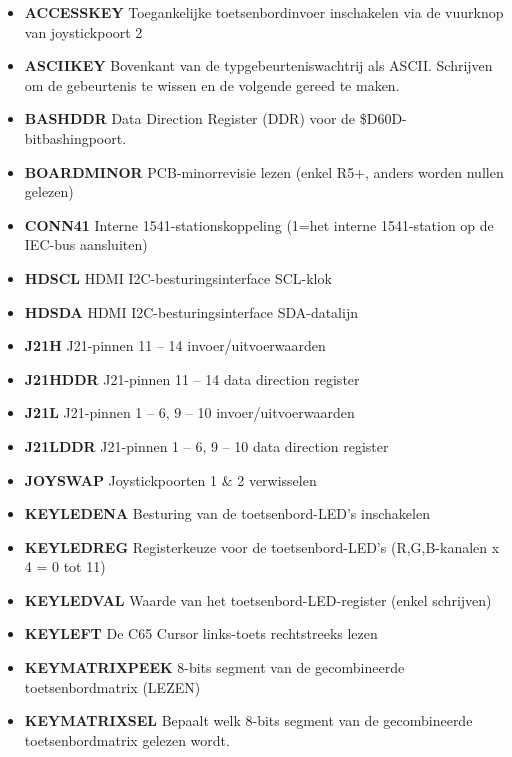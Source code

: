 \begin{itemize}
\item{\bf{ACCESSKEY}} Toegankelijke toetsenbordinvoer inschakelen via de vuurknop van joystickpoort 2
\item{\bf{ASCIIKEY}} Bovenkant van de typgebeurteniswachtrij als ASCII. Schrijven om de gebeurtenis te wissen en de volgende gereed te maken.
\item{\bf{BASHDDR}} Data Direction Register (DDR) voor de \$D60D-bitbashingpoort.
\item{\bf{BOARDMINOR}} PCB-minorrevisie lezen (enkel R5+, anders worden nullen gelezen)
\item{\bf{CONN41}} Interne 1541-stationskoppeling (1=het interne 1541-station op de IEC-bus aansluiten)
\item{\bf{HDSCL}} HDMI I2C-besturingsinterface SCL-klok
\item{\bf{HDSDA}} HDMI I2C-besturingsinterface SDA-datalijn
\item{\bf{J21H}} J21-pinnen 11 -- 14 invoer/uitvoerwaarden
\item{\bf{J21HDDR}} J21-pinnen 11 -- 14 data direction register
\item{\bf{J21L}} J21-pinnen 1 -- 6, 9 -- 10 invoer/uitvoerwaarden
\item{\bf{J21LDDR}} J21-pinnen 1 -- 6, 9 -- 10 data direction register
\item{\bf{JOYSWAP}} Joystickpoorten 1 \& 2 verwisselen
\item{\bf{KEYLEDENA}} Besturing van de toetsenbord-LED's inschakelen
\item{\bf{KEYLEDREG}} Registerkeuze voor de toetsenbord-LED's (R,G,B-kanalen x 4 = 0 tot 11)
\item{\bf{KEYLEDVAL}} Waarde van het toetsenbord-LED-register (enkel schrijven)
\item{\bf{KEYLEFT}} De C65 Cursor links-toets rechtstreeks lezen
\item{\bf{KEYMATRIXPEEK}} 8-bits segment van de gecombineerde toetsenbordmatrix (LEZEN)
\item{\bf{KEYMATRIXSEL}} Bepaalt welk 8-bits segment van de gecombineerde toetsenbordmatrix gelezen wordt.

\end{itemize}
